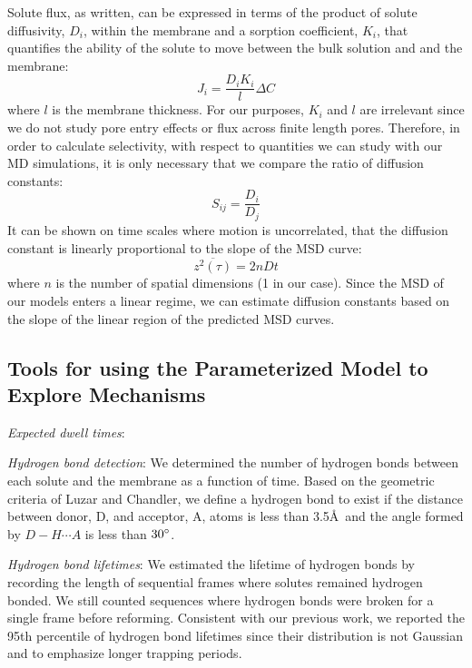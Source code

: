 \documentclass[journal=jpcbfk,manuscript=article]{achemso}
\begin{document}
  Solute flux, as written, can be expressed in terms of the product of solute 
  diffusivity, $D_i$, within the membrane and a sorption coefficient, $K_i$, 
  that quantifies the ability of the solute to move between the bulk solution
  and and the membrane:
  \begin{equation}
    J_i = \frac{D_i K_i}{l}\Delta C
  \end{equation}
  where $l$ is the membrane thickness. For our purposes, $K_i$ and $l$ are 
  irrelevant since we do not study pore entry effects or flux across finite
  length pores. Therefore, in order to calculate selectivity, with respect
  to quantities we can study with our MD simulations, it is only necessary that
  we compare the ratio of diffusion constants:
  \begin{equation}
    S_{ij} = \frac{D_i}{D_j}
    \label{eqn:selectivity_diffusivity}
  \end{equation}
  It can be shown on time scales where motion is uncorrelated, that the diffusion
  constant is linearly proportional to the slope of the MSD curve:~\cite{einstein_investigations_1956}
  \begin{equation}
    \overline{z^2(\tau)} = 2 n D t
    \label{eqn:msd_D}
  \end{equation}
  where $n$ is the number of spatial dimensions (1 in our case). Since the MSD
  of our models enters a linear regime, we can estimate diffusion constants 
  based on the slope of the linear region of the predicted MSD curves. 

  \subsection{Tools for using the Parameterized Model to Explore Mechanisms}\label{method:interactions}
  
  \textit{Expected dwell times}: 
  
  \textit{Hydrogen bond detection}: We determined the number of hydrogen bonds 
  between each solute and the membrane as a function of time. Based on the 
  geometric criteria of Luzar and Chandler, we define a hydrogen bond to exist 
  if the distance between donor, D, and acceptor, A, atoms is less than 
  3.5\AA~and the angle formed by $D-H \cdots A$ is less than $30\degree$.~\cite{luzar_effect_1996}
  
  \textit{Hydrogen bond lifetimes}: We estimated the lifetime of hydrogen bonds by 
  recording the length of sequential frames where solutes remained hydrogen bonded.
  We still counted sequences where hydrogen bonds were broken for a single frame 
  before reforming. Consistent with our previous work, we reported the 95th 
  percentile of hydrogen bond lifetimes since their distribution is not Gaussian
  and to emphasize longer trapping periods.~\cite{coscia_chemically_2019}
  
\end{document}
